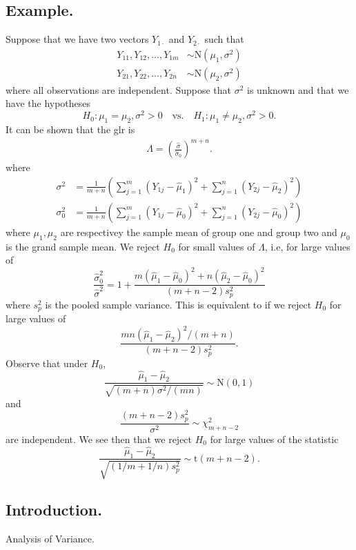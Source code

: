 \documentclass[titlepage]{article}
\begin{document}
\subsection{Example.} Suppose that we have two vectors $Y_{1\cdot}$ and $Y_{2\cdot}$ such that 
\begin{align*}
    Y_{11}, Y_{12}, \ldots, Y_{1m} &\sim \text{N}(\mu_{1}, \sigma^{2}) \\
    Y_{21}, Y_{22}, \ldots, Y_{2n} &\sim \text{N}(\mu_{2}, \sigma^{2})
\end{align*}
where all observations are independent. Suppose that $\sigma^{2}$ is unknown and that we have the hypotheses 
$$H_{0}: \mu_{1} = \mu_{2}, \sigma^{2} > 0 \quad \text{vs.} \quad H_{1}: \mu_{1} \neq \mu_{2}, \sigma^{2} > 0.$$
It can be shown that the glr is 
\begin{align*}
    \Lambda = \left(\frac{\hat{\sigma}}{\hat{\sigma}_{0}}\right)^{m+n}.
\end{align*}
where 
\begin{align*}
    \sigma^{2} &= \frac{1}{m+n}\left(\sum_{j=1}^{m}(Y_{1j} - \hat{\mu}_{1})^{2}  + \sum_{j=1}^{n}(Y_{2j} - \hat{\mu}_{2})^{2}\right) \\
    \sigma^{2}_{0} &= \frac{1}{m+n}\left(\sum_{j=1}^{m}(Y_{1j} - \hat{\mu}_{0})^{2}  + \sum_{j=1}^{n}(Y_{2j} - \hat{\mu}_{0})^{2}\right)
\end{align*}
where $\mu_{1}, \mu_{2}$ are respectivey the sample mean of group one and group two and $\mu_{0}$ is the grand sample mean. We reject $H_{0}$ for small values of $\Lambda$, i.e, for large values of 
$$\frac{\hat{\sigma}_{0}^{2}}{\hat{\sigma}^{2}} = 1 + \frac{m(\hat{\mu}_{1} - \hat{\mu}_{0})^{2} + n(\hat{\mu}_{2} - \hat{\mu}_{0})^{2}}{(m+n-2)s_{p}^{2}}$$
where $s_{p}^{2}$ is the pooled sample variance. This is equivalent to if we reject $H_{0}$ for large values of 
$$\frac{mn(\hat{\mu}_{1} - \hat{\mu}_{2})^{2}/(m+n)}{(m+n-2)s_{p}^{2}}.$$
Observe that under $H_{0}$, 
$$\frac{\hat{\mu}_{1} - \hat{\mu}_{2}}{\sqrt{(m+n)\sigma^{2}/(mn)}} \sim \text{N}(0, 1)$$
and 
$$\frac{(m+n-2)s_{p}^{2}}{\sigma^{2}} \sim \chi_{m+n-2}^{2}$$
are independent. We see then that we reject $H_{0}$ for large values of the statistic 
$$\frac{\hat{\mu}_{1} - \hat{\mu}_{2}}{\sqrt{(1/m + 1/n)s_{p}^{2}}} \sim \text{t}(m+n-2).$$

\newpage {}

\subsection{Introduction.} Analysis of Variance.
\end{document}
